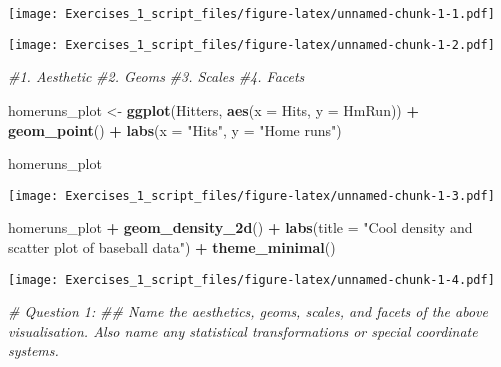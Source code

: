 \documentclass[
]{article}
\newenvironment{Shaded}{\begin{snugshade}}{\end{snugshade}}
\newcommand{\CommentTok}[1]{\textcolor[rgb]{0.56,0.35,0.01}{\textit{#1}}}
\newcommand{\DataTypeTok}[1]{\textcolor[rgb]{0.13,0.29,0.53}{#1}}
\newcommand{\KeywordTok}[1]{\textcolor[rgb]{0.13,0.29,0.53}{\textbf{#1}}}
\newcommand{\NormalTok}[1]{#1}
\newcommand{\OperatorTok}[1]{\textcolor[rgb]{0.81,0.36,0.00}{\textbf{#1}}}
\newcommand{\StringTok}[1]{\textcolor[rgb]{0.31,0.60,0.02}{#1}}
\begin{document}
\texttt{[image: Exercises\_1\_script\_files/figure-latex/unnamed-chunk-1-1.pdf]}

\begin{Shaded}
\end{Shaded}

\texttt{[image: Exercises\_1\_script\_files/figure-latex/unnamed-chunk-1-2.pdf]}

\begin{Shaded}
\begin{Highlighting}[]
\CommentTok{\#1. Aesthetic}
\CommentTok{\#2. Geoms}
\CommentTok{\#3. Scales}
\CommentTok{\#4. Facets}

\NormalTok{homeruns\_plot \textless{}{-}}\StringTok{ }
\StringTok{  }\KeywordTok{ggplot}\NormalTok{(Hitters, }\KeywordTok{aes}\NormalTok{(}\DataTypeTok{x =}\NormalTok{ Hits, }\DataTypeTok{y =}\NormalTok{ HmRun)) }\OperatorTok{+}
\StringTok{  }\KeywordTok{geom\_point}\NormalTok{() }\OperatorTok{+}
\StringTok{  }\KeywordTok{labs}\NormalTok{(}\DataTypeTok{x =} \StringTok{"Hits"}\NormalTok{, }\DataTypeTok{y =} \StringTok{"Home runs"}\NormalTok{)}

\NormalTok{homeruns\_plot}
\end{Highlighting}
\end{Shaded}

\texttt{[image: Exercises\_1\_script\_files/figure-latex/unnamed-chunk-1-3.pdf]}

\begin{Shaded}
\begin{Highlighting}[]
\NormalTok{homeruns\_plot }\OperatorTok{+}\StringTok{ }
\StringTok{  }\KeywordTok{geom\_density\_2d}\NormalTok{() }\OperatorTok{+}
\StringTok{  }\KeywordTok{labs}\NormalTok{(}\DataTypeTok{title =} \StringTok{"Cool density and scatter plot of baseball data"}\NormalTok{) }\OperatorTok{+}
\StringTok{  }\KeywordTok{theme\_minimal}\NormalTok{()}
\end{Highlighting}
\end{Shaded}

\texttt{[image: Exercises\_1\_script\_files/figure-latex/unnamed-chunk-1-4.pdf]}

\begin{Shaded}
\begin{Highlighting}[]
\CommentTok{\# Question 1:}
\CommentTok{\#\# Name the aesthetics, geoms, scales, and facets of the above visualisation. Also name any statistical transformations or special coordinate systems.}
\end{Highlighting}
\end{Shaded}
\end{document}
